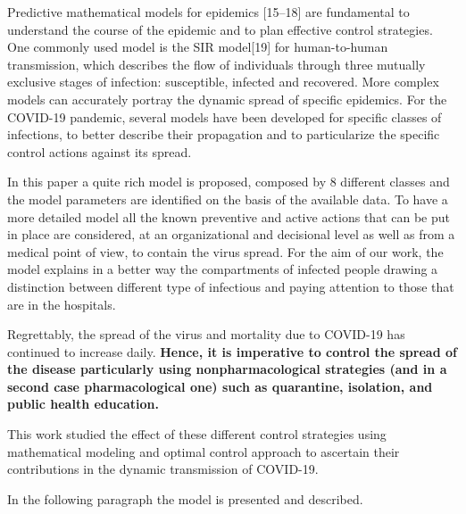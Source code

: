 \documentclass[a4paper]{article}
\begin{document}
\textcolor[rgb]{0.07450981,0.078431375,0.07450981}{Predictive mathematical models for epidemics [15–18] are fundamental
to understand the course of the epidemic and to plan effective control strategies. One commonly used model is the SIR
model[19] for human-to-human transmission, which describes the flow of individuals through three mutually exclusive
stages of infection: susceptible, infected and recovered. More complex models can accurately portray the dynamic spread
of specific epidemics. For the COVID-19 pandemic, several models have been developed for specific classes of
infections, to better describe their propagation and to particularize the specific control actions against its spread.}

\textcolor[rgb]{0.07450981,0.078431375,0.07450981}{In this paper a quite rich model is proposed, composed by 8 different
classes and the model parameters are identified on the basis of the available data. To have a more detailed model all
the known preventive and active actions that can be put in place are considered, at an organizational and decisional
level as well as from a medical point of view, to contain the virus spread. For the aim of our work, the model explains
in a better way the compartments of infected people drawing a distinction between different type of infectious and
paying attention to those that are in the hospitals. }

\textcolor[rgb]{0.07450981,0.078431375,0.07450981}{Regrettably, the spread of the virus and mortality due to COVID-19
has continued to increase daily. }\textbf{\textcolor[rgb]{0.07450981,0.078431375,0.07450981}{Hence, it is imperative to
control the spread of the disease particularly using nonpharmacological strategies (and in a second case
pharmacological one) such as quarantine, isolation, and public health education.}}

\textcolor[rgb]{0.07450981,0.078431375,0.07450981}{This work studied the effect of these different control strategies
using mathematical modeling and optimal control approach to ascertain their contributions in the dynamic transmission
of COVID-19. }

\textcolor[rgb]{0.07450981,0.078431375,0.07450981}{In the following paragraph the model is presented and described. }


\bigskip
\end{document}
